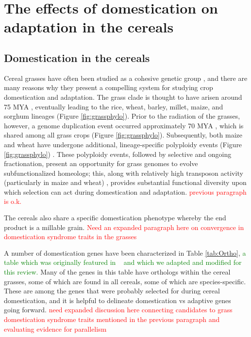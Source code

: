 \documentclass[12pt]{article}
\newcommand{\mbh}[1]{\textcolor{red}{\normalsize  #1}}
\newcommand{\mw}[1]{\textcolor{green}{\normalsize #1}}
\begin{document}
\paragraph{}

\section*{The effects of domestication on adaptation in the cereals}

\subsection*{Domestication in the cereals}
Cereal grasses have often been studied as a cohesive genetic group \citep{pmid8379002, pmid11244100}, and there are many reasons why they present a compelling system for studying crop domestication and adaptation.
The grass clade is thought to have arisen around 75 MYA \citep{BOUCHENAKKHELLADI2010, Kellogg2001}, eventually leading to the rice, wheat, barley, millet, maize, and sorghum lineages (Figure \ref{fig:grassphylo}).
Prior to the radiation of the grasses, however, a genome duplication event occurred approximately 70 MYA \citep{Paterson2004}, which is shared among all grass crops (Figure \ref{fig:grassphylo}).
Subsequently, both maize and wheat have undergone additional, lineage-specific polyploidy events (Figure \ref{fig:grassphylo}) \citep{Levy2002}.
These polyploidy events, followed by selective and ongoing fractionation, present an opportunity for grass genomes to evolve subfunctionalized homeologs; this, along with relatively high transposon activity (particularly in maize and wheat) \citep{Wicker2016, Lisch2001}, provides substantial functional diversity upon which selection can act during domestication and adaptation.
\mbh{previous paragraph is o.k.}

The cereals also share a specific domestication phenotype whereby the end product is a millable grain.  \mbh{Need an expanded paragraph here on convergence in domestication syndrome traits in the grasses}

A number of domestication genes have been characterized in Table \ref{tab:Ortho}, \mw{a table which was originally featured in ~\citep{Lenser2013} and which we adapted and modified for this review.} Many of the genes in this table have orthologs within the cereal grasses, some of which are found in all cereals, some of which are species-specific. These are among the genes that were probably selected for during cereal domestication, and it is helpful to delineate domestication vs adaptive genes going forward. \mbh{need expanded discussion here connecting candidates to grass domestication syndrome traits mentioned in the previous paragraph and evaluating evidence for parallelism}
\end{document}
